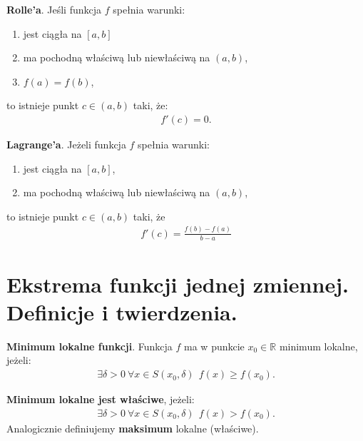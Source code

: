 \documentclass[main.tex]{subfiles}
\begin{document}
    \begin{theorem}
        \textbf{Rolle'a}. Jeśli funkcja $f$ spełnia warunki:
        \begin{enumerate}
            \item jest ciągła na $[a,b]$
            \item ma pochodną właściwą lub niewłaściwą na $(a,b)$,
            \item $f(a) = f(b)$,
        \end{enumerate}
        to istnieje punkt $c \in (a,b)$ taki, że:
        \begin{align*}
            f'(c) = 0.
        \end{align*}
    \end{theorem}

    \begin{theorem}
        \textbf{Lagrange'a}. Jeżeli funkcja $f$ spełnia warunki:
        \begin{enumerate}
            \item jest ciągła na $[a,b]$,
            \item ma pochodną właściwą lub niewłaściwą na $(a,b)$,
        \end{enumerate}
        to istnieje punkt $c \in (a,b)$ taki, że
        \begin{align*}
            f'(c) = \frac{f(b)-f(a)}{b-a}
        \end{align*}
    \end{theorem}


    \section{Ekstrema funkcji jednej zmiennej. Definicje i twierdzenia.}

    \begin{definition}
        \textbf{Minimum lokalne funkcji}. Funkcja $f$ ma w punkcie $x_0 \in \mathbb{R}$ minimum lokalne, jeżeli:
        \begin{align*}
            \exists \delta > 0 ~ \forall x \in S(x_0, \delta) ~~ f(x) \geq f(x_0).
        \end{align*}

        \textbf{Minimum lokalne jest właściwe}, jeżeli:
        \begin{align*}
            \exists \delta > 0 ~ \forall x \in S(x_0, \delta) ~~ f(x) > f(x_0).
        \end{align*}
        Analogicznie definiujemy \textbf{maksimum} lokalne (właściwe).
    \end{definition}
\end{document}
